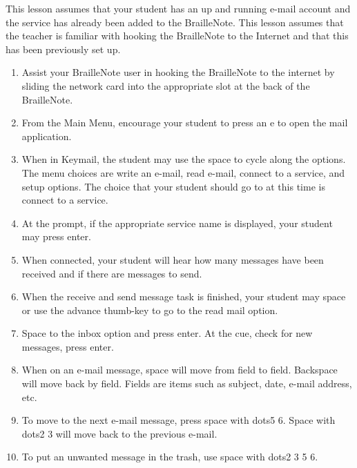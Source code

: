 \documentclass[10pt,letterpaper,twoside]{report}
\begin{document}
{{{{This lesson assumes that your student has an up and running e-mail account and the service has already been added to the BrailleNote. This lesson assumes that the teacher is familiar with hooking the BrailleNote to the Internet and that this has been previously set up.



\begin{enumerate}
	\item Assist your BrailleNote user in hooking the BrailleNote to the internet by sliding the network card into the appropriate slot at the back of the BrailleNote.
	      
	\item From the Main Menu, encourage your student to press an e to open the mail application.
	      
	\item When in Keymail, the student may use the space to cycle along the options.  The menu choices are write an e-mail, read e-mail, connect to a service, and setup options.  The choice that your student should go to at this time is connect to a service.
	      
	\item At the prompt, if the appropriate service name is displayed, your student may press enter.
	      
	\item When connected, your student will hear how many messages have been received and if there are messages to send.
	      
	\item When the receive and send message task is finished, your student may space or use the advance thumb-key to go to the read mail option.
	      
	\item Space to the inbox option and press enter.  At the cue, check for new messages, press enter.
	      
	\item When on an e-mail message, space will move from field to field. Backspace will move back by field.  Fields are items such as subject, date, e-mail address, etc.
	      
	\item To move to the next e-mail message, press space with dots5 6.  Space with dots2 3 will move back to the previous e-mail.
	      
	\item To put an unwanted message in the trash, use space with dots2 3 5 6.
	      

\end{enumerate}}}}}
\end{document}
